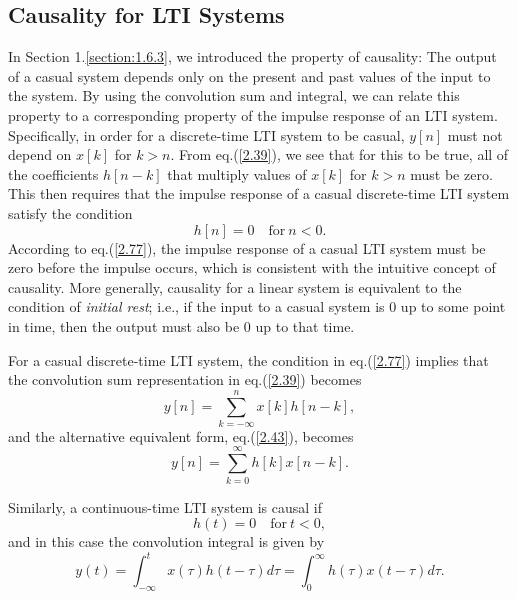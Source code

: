 \documentclass[a4paper,10pt,twoside]{book}
\begin{document}
\subsection{Causality for LTI Systems}

In Section 1.\ref{section:1.6.3}, we introduced the property of causality: The output of a casual system depends only on the present and past values of the input to the system. By using the convolution sum and integral, we can relate this property to a corresponding property of the impulse response of an LTI system. Specifically, in order for a discrete-time LTI system to be casual, $y[n]$ must not depend on $x[k]$ for $k>n$. From eq.\;(\ref{2.39}), we see that for this to be true, all of the coefficients $h[n-k]$ that multiply values of $x[k]$ for $k>n$ must be zero. This then requires that the impulse response of a casual discrete-time LTI system satisfy the condition
\begin{equation}
    h[n]=0\quad\mathrm{for~}n<0.
    \label{2.77}
\end{equation}
According to eq.\;(\ref{2.77}), the impulse response of a casual LTI system must be zero before the impulse occurs, which is consistent with the intuitive concept of causality. More generally, causality for a linear system is equivalent to the condition of \textit{initial rest}; i.e., if the input to a casual system is 0 up to some point in time, then the output must also be 0 up to that time.

For a casual discrete-time LTI system, the condition in eq.\;(\ref{2.77}) implies that the convolution sum representation in eq.\;(\ref{2.39}) becomes
\begin{equation}
    y[n]=\sum_{k=-\infty}^nx[k]h[n-k],
    \label{2.78}
\end{equation}
and the alternative equivalent form, eq.\;(\ref{2.43}), becomes
\begin{equation}
    y[n]=\sum_{k=0}^\infty h[k]x[n-k].
    \label{2.79}
\end{equation}

Similarly, a continuous-time LTI system is causal if
\begin{equation}
    h(t)=0\quad\mathrm{for~}t<0,
    \label{2.80}
\end{equation}
and in this case the convolution integral is given by
\begin{equation}
    y(t)=\int_{-\infty}^{t}x(\tau)h(t-\tau)d\tau=\int_{0}^{\infty}h(\tau)x(t-\tau)d\tau.
    \label{2.81}
\end{equation}
\end{document}

